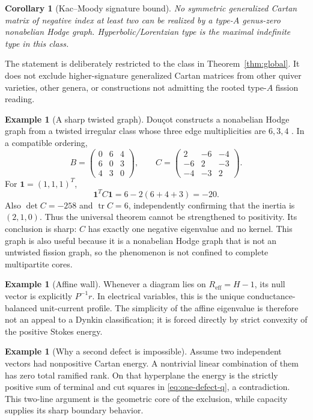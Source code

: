 \documentclass[11pt,a4paper]{amsart}
\theoremstyle{plain}
\newtheorem{corollary}[theorem]{Corollary}
\theoremstyle{definition}
\newtheorem{example}[theorem]{Example}
\newcommand{\one}{\mathbf 1}
\begin{document}
\begin{corollary}[Kac--Moody signature bound]\label{cor:Kac}
No symmetric generalized Cartan matrix of negative index at least two can be realized by a
type-$A$ genus-zero nonabelian Hodge graph.  Hyperbolic/Lorentzian type is the maximal indefinite
type in this class.
\end{corollary}

The statement is deliberately restricted to the class in Theorem~\ref{thm:global}.  It does not
exclude higher-signature generalized Cartan matrices from other quiver varieties, other genera,
or constructions not admitting the rooted type-$A$ fission reading.

\begin{example}[A sharp twisted graph]\label{ex:twisted-triangle}
Dou\c cot constructs a nonabelian Hodge graph from a twisted irregular class whose three edge
multiplicities are $6,3,4$ \cite[Proposition~3.3]{Doucot2025Graphs}.  In a compatible ordering,
\[
 B=\begin{pmatrix}0&6&4\\6&0&3\\4&3&0\end{pmatrix},\qquad
 C=\begin{pmatrix}2&-6&-4\\-6&2&-3\\-4&-3&2\end{pmatrix}.
\]
For $\one=(1,1,1)^T$,
\[
                         \one^TC\one=6-2(6+4+3)=-20.
\]
Also $\det C=-258$ and $\operatorname{tr}C=6$, independently confirming that the inertia is
$(2,1,0)$.
Thus the universal theorem cannot be strengthened to positivity.  Its conclusion is sharp:
$C$ has exactly one negative eigenvalue and no kernel.  This graph is also useful because it is a
nonabelian Hodge graph that is not an untwisted fission graph, so the phenomenon is not confined to
complete multipartite cores.
\end{example}

\begin{example}[Affine wall]
Whenever a diagram lies on $R_{\mathrm{eff}}=H-1$, its null vector is explicitly
$P^{-1}r$.  In electrical variables, this is the unique conductance-balanced unit-current profile.
The simplicity of the affine eigenvalue is therefore not an appeal to a Dynkin classification; it
is forced directly by strict convexity of the positive Stokes energy.
\end{example}

\begin{example}[Why a second defect is impossible]
Assume two independent vectors had nonpositive Cartan energy.  A nontrivial linear combination of
them has zero total ramified rank.  On that hyperplane the energy is the strictly positive sum of
terminal and cut squares in \eqref{eq:one-defect-q}, a contradiction.  This two-line argument is
the geometric core of the exclusion, while capacity supplies its sharp boundary behavior.
\end{example}
\end{document}
